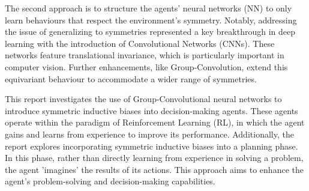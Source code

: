 The second approach is to structure the agents' neural networks (NN) to only learn behaviours that respect the environment's symmetry\cite{vanderpol2020mdp,wang2022so2, mondal2020group}. Notably, addressing the issue of generalizing to symmetries represented a key breakthrough in deep learning with the introduction of Convolutional Networks (CNNs)\cite{lecun1989backprop}. These networks feature translational invariance, which is particularly important in computer vision. Further enhancements, like Group-Convolution\cite{cohen2016group}, extend this equivariant behaviour to accommodate a wider range of symmetries.

This report investigates the use of Group-Convolutional neural networks to introduce symmetric inductive biases into decision-making agents. These agents operate within the paradigm of Reinforcement Learning (RL), in which the agent gains and learns from experience to improve its performance. Additionally, the report explores incorporating symmetric inductive biases into a planning phase. In this phase, rather than directly learning from experience in solving a problem, the agent 'imagines' the results of its actions. This approach aims to enhance the agent's problem-solving and decision-making capabilities.
